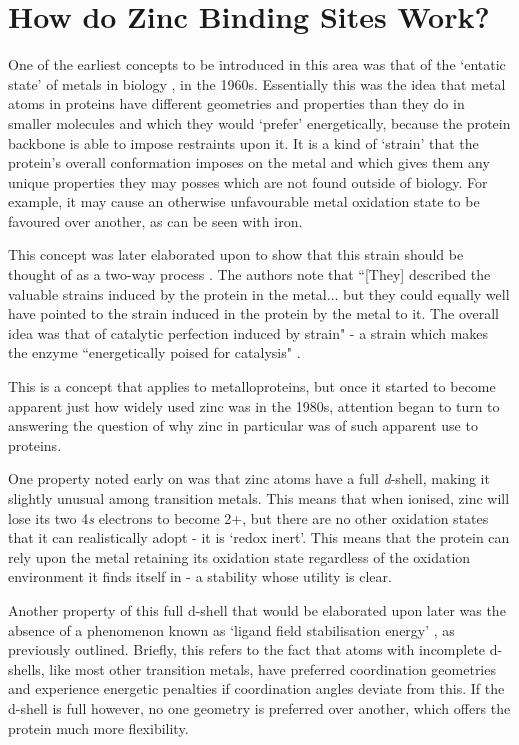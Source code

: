 \section{How do Zinc Binding Sites Work?}

One of the earliest concepts to be introduced in this area was that of the `entatic state' of metals in biology \cite{vallee1968metalloenzymes}, in the 1960s. Essentially this was the idea that metal atoms in proteins have different geometries and properties than they do in smaller molecules and which they would `prefer' energetically, because the protein backbone is able to impose restraints upon it. It is a kind of `strain' that the protein's overall conformation imposes on the metal and which gives them any unique properties they may posses which are not found outside of biology. For example, it may cause an otherwise unfavourable metal oxidation state to be favoured over another, as can be seen with iron.

This concept was later elaborated upon to show that this strain should be thought of as a two-way process \cite{williams1985symbiosis}. The authors note that ``[They] described the valuable strains induced by the protein in the metal... but they could equally well have pointed to the strain induced in the protein by the metal to it. The overall idea was that of catalytic perfection induced by strain" - a strain which makes the enzyme ``energetically poised for catalysis" \cite{vallee1984metallobiochemistry}.

This is a concept that applies to metalloproteins, but once it started to become apparent just how widely used zinc was in the 1980s, attention began to turn to answering the question of why zinc in particular was of such apparent use to proteins.

One property noted early on \cite{vallee1984metallobiochemistry} was that zinc atoms have a full \textit{d}-shell, making it slightly unusual among transition metals. This means that when ionised, zinc will lose its two 4\textit{s} electrons to become 2+, but there are no other oxidation states that it can realistically adopt - it is `redox inert'. This means that the protein can rely upon the metal retaining its oxidation state regardless of the oxidation environment it finds itself in - a stability whose utility is clear.

Another property of this full d-shell that would be elaborated upon later was the absence of a phenomenon known as `ligand field stabilisation energy' \cite{lachenmann2004zinc,vahrenkamp2007does,maret2009coordination,krkezel2016biological}, as previously outlined. Briefly, this refers to the fact that atoms with incomplete d-shells, like most other transition metals, have preferred coordination geometries and experience energetic penalties if coordination angles deviate from this. If the d-shell is full however, no one geometry is preferred over another, which offers the protein much more flexibility.

